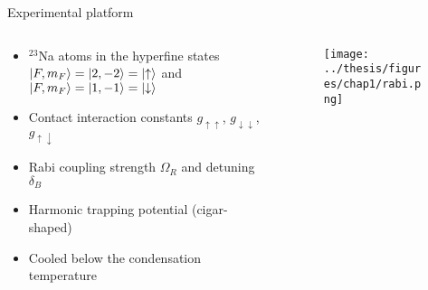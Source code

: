 \documentclass[aspectratio=169]{beamer}
\begin{document}


\begin{frame}{Experimental platform}
  \begin{columns}
    \begin{column}{0.5\textwidth}
      \begin{itemize}
        \item $^{23}$Na atoms in the hyperfine states $\ket{F,m_F} = \ket{2, -2} = \ket{\uparrow}$ and $\ket{F,m_F} = \ket{1, -1} = \ket{\downarrow}$
        \item Contact interaction constants $g_{\uparrow\uparrow}$, $g_{\downarrow\downarrow}$, $g_{\uparrow\downarrow}$
        \item Rabi coupling strength $\Omega_R$ and detuning $\delta_B$
        \item Harmonic trapping potential (cigar-shaped)
        \item Cooled below the condensation temperature
      \end{itemize}
    \end{column}
    \begin{column}{0.5\textwidth}
      \begin{figure}
        \centering
        \texttt{[image: ../thesis/figures/chap1/rabi.png]}
      \end{figure}
    \end{column}
  \end{columns}
\end{frame}
\end{document}
